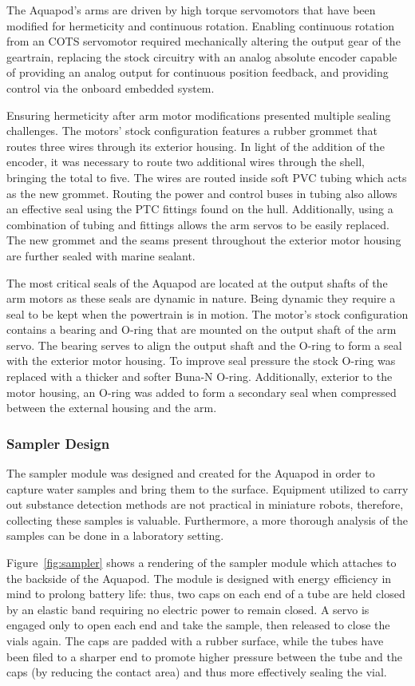 		The Aquapod's arms are driven by high torque servomotors that have been modified for hermeticity and continuous rotation. Enabling continuous rotation from an COTS servomotor required mechanically altering the output gear of the geartrain, replacing the stock circuitry with an analog absolute encoder capable of providing an analog output for continuous position feedback, and providing control via the onboard embedded system. 
		
		Ensuring hermeticity after arm motor modifications presented multiple sealing challenges.  The motors' stock configuration features a rubber grommet that routes three wires through its exterior housing.  In light of the addition of the encoder, it was necessary to route two additional wires through the shell, bringing the total to five.  The wires are routed inside soft PVC tubing which acts as the new grommet. Routing the power and control buses in tubing also allows an effective seal using the PTC fittings found on the hull. Additionally, using a combination of tubing and fittings allows the arm servos to be easily replaced. The new grommet and the seams present throughout the exterior motor housing are further sealed with marine sealant.  

	The most critical seals of the Aquapod are located at the output shafts of the arm motors as these seals are dynamic in nature. Being dynamic they require a seal to be kept when the powertrain is in motion. The motor's stock configuration contains a bearing and O-ring that are mounted on the output shaft of the arm servo. The bearing serves to align the output shaft and the O-ring to form a seal with the exterior motor housing. To improve seal pressure the stock O-ring was replaced with a thicker and softer Buna-N O-ring. Additionally, exterior to the motor housing, an O-ring was added to form a secondary seal when compressed between the external housing and the arm. 	

	\subsubsection{Sampler Design}
		 The sampler module was designed and created for the Aquapod in order to capture water samples and bring them to the surface. Equipment utilized to carry out substance detection methods are not practical in miniature robots, therefore, collecting these samples is valuable. Furthermore, a more thorough analysis of the samples can be done in a laboratory setting.

Figure~\ref{fig:sampler} shows a rendering of the sampler module which attaches to the backside of the Aquapod.  The module is designed with energy efficiency in mind to prolong battery life: thus, two caps on each end of a tube are held closed by an elastic band requiring no electric power to remain closed.  A servo is engaged only to open each end and take the sample, then released to close the vials again.  The caps are padded with a rubber surface, while the tubes have been filed to a sharper end to promote higher pressure between the tube and the caps (by reducing the contact area) and thus more effectively sealing the vial.

